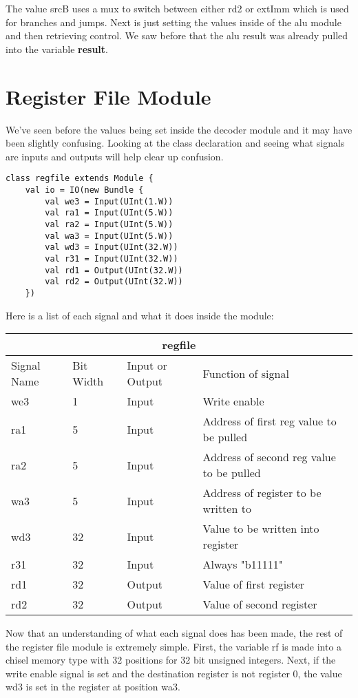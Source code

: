 \documentclass[12pt, letterpaper]{report}
\begin{document}
The value srcB uses a mux to switch between either rd2 or extImm which is used for branches and jumps.
Next is just setting the values inside of the alu module and then retrieving control. We saw before that
the alu result was already pulled into the variable \textbf{result}. 

\section{Register File Module}
We've seen before the values being set inside the decoder module and it may have been slightly confusing.
Looking at the class declaration and seeing what signals are inputs and outputs will help clear up confusion.

\begin{lstlisting}[style=scala]
   class regfile extends Module {
    val io = IO(new Bundle {
        val we3 = Input(UInt(1.W))
        val ra1 = Input(UInt(5.W))
        val ra2 = Input(UInt(5.W))
        val wa3 = Input(UInt(5.W))
        val wd3 = Input(UInt(32.W))
        val r31 = Input(UInt(32.W))
        val rd1 = Output(UInt(32.W))
        val rd2 = Output(UInt(32.W))
    })
\end{lstlisting}

Here is a list of each signal and what it does inside the module:

\begin{tabular}{ |p{1cm}||p{1cm}|p{2cm}|p{7cm}|  }
   \hline
   \multicolumn{4}{|c|}{regfile} \\
   \hline
   Signal Name & Bit Width & Input or Output & Function of signal\\
   \hline
   we3    & 1   & Input  & Write enable\\
   ra1    & 5   & Input  & Address of first reg value to be pulled\\
   ra2    & 5   & Input  & Address of second reg value to be pulled\\
   wa3    & 5   & Input  & Address of register to be written to\\
   wd3    & 32  & Input  & Value to be written into register\\
   r31    & 32  & Input  & Always "b11111"\\
   rd1    & 32  & Output & Value of first register\\
   rd2    & 32  & Output & Value of second register\\
   \hline
  \end{tabular}

Now that an understanding of what each signal does has been made, the rest of the register file module
is extremely simple. First, the variable rf is made into a chisel memory type with 32 positions for 32
bit unsigned integers. Next, if the write enable signal is set and the destination register is not register 0,
the value wd3 is set in the register at position wa3. 
\end{document}
